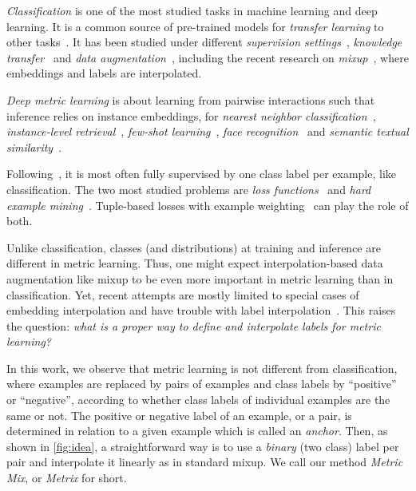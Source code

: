 \documentclass{article}
\begin{document}
\emph{Classification} is one of the most studied tasks in machine learning and deep learning. It is a common source of pre-trained models for \emph{transfer learning} to other tasks~\citep{donahue2014decaf,ECCV2020_211}. It has been studied under different \emph{supervision settings}~\citep{caron2018deep,sohn2020fixmatch}, \emph{knowledge transfer}~\citep{hinton2015distilling} and \emph{data augmentation}~\citep{cubuk2018autoaugment}, including the recent research on \emph{mixup}~\citep{zhang2018mixup,verma2019manifold}, where embeddings and labels are interpolated.

\emph{Deep metric learning} is about learning from pairwise interactions such that inference relies on instance embeddings, \eg for \emph{nearest neighbor classification}~\citep{oh2016deep}, \emph{instance-level retrieval}~\citep{gordo2016deep}, \emph{few-shot learning}~\citep{vinyals2016matching}, \emph{face recognition}~\citep{ facenet} and \emph{semantic textual similarity}~\citep{ReGu19}.

\endgroup

Following~\citep{xing2002distance}, it is most often fully supervised by one class label per example, like classification. The two most studied problems are \emph{loss functions}~\citep{musgrave2020metric} and \emph{hard example mining}~\citep{sampling_matters, robinson2020contrastive}. Tuple-based losses with example weighting~\citep{wang2019multi} can play the role of both.

Unlike classification, classes (and distributions) at training and inference are different in metric learning. Thus, one might expect interpolation-based data augmentation like mixup to be even more important in metric learning than in classification. Yet, recent attempts are mostly limited to special cases of embedding interpolation and have trouble with label interpolation~\citep{ko2020embedding}. This raises the question: \emph{what is a proper way to define and interpolate labels for metric learning?}

In this work, we observe that metric learning is not different from classification, where examples are replaced by pairs of examples and class labels by ``positive'' or ``negative'', according to whether class labels of individual examples are the same or not.  The positive or negative label of an example, or a pair, is determined in relation to a given example which is called an \emph{anchor}. Then, as shown in \autoref{fig:idea}, a straightforward way is to use a \emph{binary} (two class) label per pair and interpolate it linearly as in standard mixup. We call our method \emph{Metric Mix}, or \emph{Metrix} for short.
\end{document}
